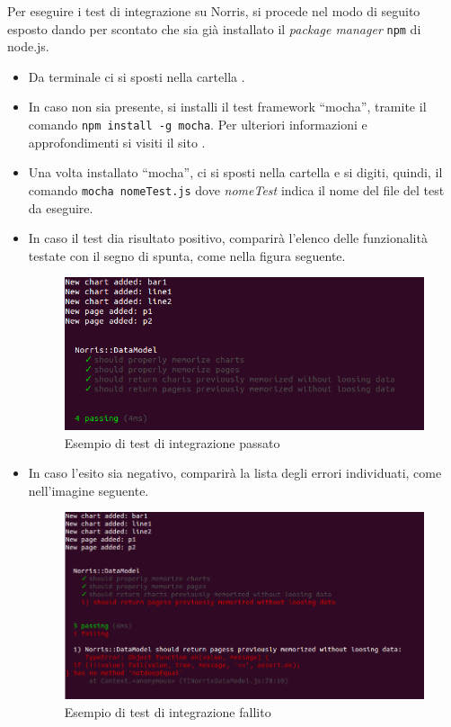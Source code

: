 					Per eseguire i test di integrazione su Norris, si procede nel modo di seguito esposto dando per scontato che sia già installato il \textit{package manager} \texttt{npm} di node.js.
					\begin{itemize}
							\item Da terminale ci si sposti nella cartella .
							\item In caso non sia presente, si installi il test framework “mocha”, tramite il comando \texttt{npm install -g mocha}. Per ulteriori informazioni e approfondimenti si visiti il sito .
							\item Una volta installato “mocha”, ci si sposti nella cartella  e si digiti, quindi, il comando \texttt{mocha nomeTest.js} dove \textit{nomeTest} indica il nome del file del test da eseguire.
							\item In caso il test dia risultato positivo, comparirà l'elenco delle funzionalità testate con il segno di spunta, come nella figura seguente.
							\begin{figure}[H]
								\centering
								\includegraphics[scale=0.5]{Pics/TIPassing.png}
								\caption{Esempio di test di integrazione passato}
							\end{figure}
							\item In caso l'esito sia negativo, comparirà la lista degli errori individuati, come nell'imagine seguente.
							\begin{figure}[H]
								\centering
								\includegraphics[scale=0.5]{Pics/TINotPassing.png}
								\caption{Esempio di test di integrazione fallito}
							\end{figure}
					\end{itemize}
